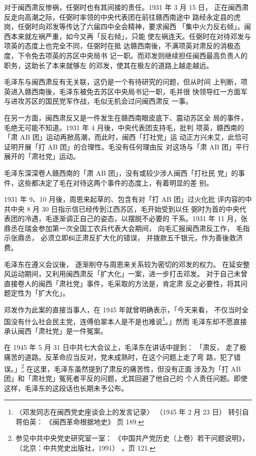 对于闽西肃反惨祸，任弼时也有其间接的责任。1931 年 3 月 15 日，
正在闽西肃反走向高潮之际，任弼时率领的中央代表团在前往赣西南途中
路经永定县的虎岗，任弼时向邓发等传达了六届四中全会精神，要求闽西
「集中火力反右倾」。闽西本来就左祸严重，如今又再「反右倾」，只能
使左祸连天。任弼时在对待邓发与项英的态度上也完全不同，任弼时在抵
达赣西南後，不满项英对肃反的消极态度，下令免去项英的苏区中央局书
记一职。而邓发则继续担任闽西最高负责人的职务，这助长了本来就够左
的邓发，使其在极左的道路上越走越远。
 
毛泽东与闽西肃反有无关联，这仍是一个有待研究的问题，但从时间
上判断，项英进入赣西南後，毛泽东被免去苏区中央局书记一职，毛并很
快领导红一方面军与进攻苏区的国民党军作战，毛似无机会过问闽西肃反
一事。

在另一方面，闽西肃反又是一件发生在赣西南眼皮底下、震动苏区全
局的事件，毛绝无可能不知道。1931 年 4 月後，中央代表团支持毛，批判
项英，赣西南的「肃 AB 团」运动再掀高潮，而此时，闽西「打社党」运
动正方兴未艾，此恰可证明开展「打 AB 团」的合理性。毛没有任何理由反
对这场与「肃 AB 团」平行展开的「肃社党」运动。

毛泽东深深卷人赣西南的「肃 AB 团」，没有或较少涉人闽西「打社民
党」的事件，这些都决定了毛在对待这两个事件的态度上，有着明显的差
别。

1931 年 9、10 月後，周恩来起草的、包含有对「打 AB 团」过火化批
评内容的中共中央 8 月 30 日指示信已经传到江西苏区，毛开始受到以任
弼时为首的中央代表团的冷遇，毛逐渐调正自己的姿态，以摆脱不必要的
干系。1931 年 11 月，张鼎丞在瑞金参加第一次全国工农兵代表大会期间，
向毛汇报闽西肃反工作，
毛指示张鼎丞，
必须立即纠正肃反扩大化的错误，
并拨款五千银元，作为善後救济费。

毛泽东在遵义会议後，
逐渐削夺与周恩来关系较为密切的邓发的权力。
在延安整风运动期间，又利用闽西肃反「扩大化」一案，进一步打击邓发。
对于自己未曾直接卷人的闽西「肃社党」事件，毛采取的方法是，肯定肃
反之必要性，将其问题定性为「扩大化」。

邓发作为此案的直接当事人，在 1945 年就曾明确表示，「今天来看，
不仅当时全国没有什么社会民主党，连傅伯翠本人是不是也难说\footnote{〈邓发同志在闽西党史座谈会上的发言记录〉
（1945 年 2 月 23 日）
转引自蒋伯英：
《闽西革命根据地史》 页 189.}。」然而
毛泽东却不愿直接承认闽西「肃社党」是一件冤案。

在 1945 年 5 月 31 日中共七大会议上，毛泽东在讲话中提到：
「肃反，
走了极痛苦的道路。反革命应当反对，党未成熟时，在这个问题上走了弯
路，犯了错误。」\footnote{参见中共中央党史研究室一室：
《中国共产党历史（上卷）若干问题说明》，
（北京：中共党史出版社，1991）
，页
121.} 在这里，毛泽东虽然提到了肃反的痛苦性，但没有正面
涉及为「打 AB 团」和「肃社党」冤死者平反的问题，尤其回避了他自己的
个人责任问题。即使这样，毛泽东的这段话也长期未予公布。
 

